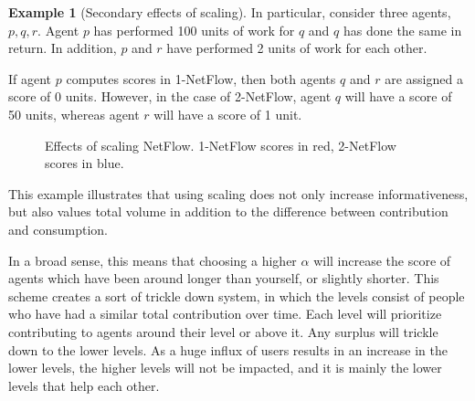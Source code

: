 \documentclass[a4paper,11pt]{book}
\theoremstyle{definition}
\newtheorem{example}{Example}
\begin{document}
\begin{example}[Secondary effects of scaling]
    In particular, consider three agents, $p, q, r$. Agent $p$ has performed 100 units of
    work for $q$ and $q$ has done the same in return. In addition, $p$ and $r$ have performed
    2 units of work for each other.

    If agent $p$ computes scores
    in 1-NetFlow, then both agents $q$ and $r$ are assigned a score of 0 units.
    However, in the case of 2-NetFlow, agent $q$ will have a score of 50 units,
    whereas agent $r$ will have a score of 1 unit.
      
    \begin{figure}[h]
        \centering
         \caption{Effects of scaling NetFlow. 1-NetFlow scores in red, 2-NetFlow scores in blue.}
         \label{fig:ex_scaling_goodness}
    \end{figure}
    
    This example illustrates that using scaling does not only increase informativeness, but also
    values total volume in addition to the difference between contribution and consumption. 
 
    \label{ex:scaling_goodness}
\end{example}


In a broad sense, this means that choosing a higher $\alpha$ will increase the score 
of agents which have been around longer than yourself, or slightly shorter. This
scheme creates a sort of trickle down system, in which the levels consist of people
who have had a similar total contribution over time. Each level will prioritize
contributing to agents around their level or above it. Any surplus will trickle down
to the lower levels. As a huge influx of users results in an increase in the lower
levels, the higher levels will not be impacted, and it is mainly the
lower levels that help each other.
\end{document}
